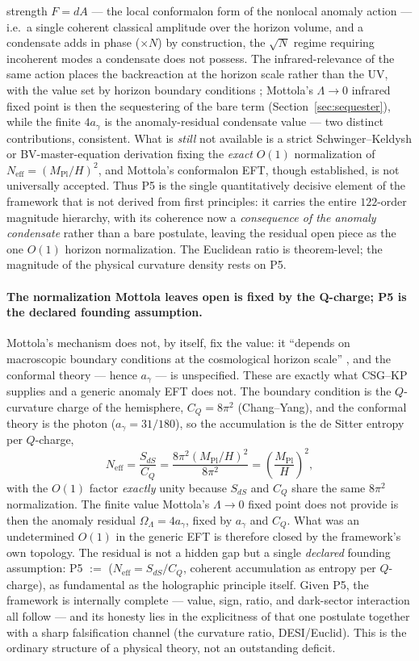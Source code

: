 \documentclass[11pt,a4paper]{article}
\theoremstyle{plain}
\theoremstyle{definition}
\theoremstyle{remark}
\newcommand{\OL}{\Omega_\Lambda}
\newcommand{\ag}{a_\gamma}
\newcommand{\CQ}{C_Q}
\newcommand{\Mpl}{M_{\mathrm{Pl}}}
\begin{document}
strength $F=dA$ --- the local conformalon form of the nonlocal anomaly action --- i.e.\ a single
coherent classical amplitude over the horizon volume, and a condensate adds in phase ($\times N$) by
construction, the $\sqrt N$ regime requiring incoherent modes a condensate does not possess. The
infrared-relevance of the same action places the backreaction at the horizon scale rather than the
UV, with the value set by horizon boundary conditions \cite{Mottola2010}; Mottola's
$\Lambda\to0$ infrared fixed point is then the sequestering of the bare term
(Section~\ref{sec:sequester}), while the finite $4\ag$ is the anomaly-residual condensate value ---
two distinct contributions, consistent. What is \emph{still} not available is a
strict Schwinger--Keldysh or BV-master-equation derivation fixing the \emph{exact} $O(1)$
normalization of $N_{\mathrm{eff}}=(\Mpl/H)^2$, and Mottola's conformalon EFT, though established, is
not universally accepted. Thus P5 is the single quantitatively decisive
element of the framework that is not derived from first principles: it carries the entire
$122$-order magnitude hierarchy, with its coherence now a \emph{consequence of the anomaly
condensate} rather than a bare postulate, leaving the residual open piece as the one $O(1)$ horizon
normalization. The Euclidean ratio is theorem-level; the magnitude of the physical curvature
density rests on P5.

\paragraph{The normalization Mottola leaves open is fixed by the Q-charge; P5 is the declared
founding assumption.} Mottola's mechanism does not, by itself, fix the value: it ``depends on
macroscopic boundary conditions at the cosmological horizon scale'' \cite{Mottola2010}, and the
conformal theory --- hence $\ag$ --- is unspecified. These are exactly what CSG--KP supplies and a
generic anomaly EFT does not. The boundary condition is the $Q$-curvature charge of the hemisphere,
$\CQ=8\pi^2$ (Chang--Yang), and the conformal theory is the photon ($\ag=31/180$), so the
accumulation is the de Sitter entropy per $Q$-charge,
\begin{equation}
N_{\mathrm{eff}} = \frac{S_{dS}}{\CQ} = \frac{8\pi^2(\Mpl/H)^2}{8\pi^2} = \left(\frac{\Mpl}{H}\right)^2 ,
\end{equation}
with the $O(1)$ factor \emph{exactly} unity because $S_{dS}$ and $\CQ$ share the same $8\pi^2$
normalization. The finite value Mottola's $\Lambda\to0$ fixed point does not provide is then the
anomaly residual $\OL=4\ag$, fixed by $\ag$ and $\CQ$. What was an undetermined $O(1)$ in the
generic EFT is therefore closed by the framework's own topology. The residual is not a hidden gap
but a single \emph{declared} founding assumption: P5 $:=$ ($N_{\mathrm{eff}}=S_{dS}/\CQ$, coherent
accumulation as entropy per $Q$-charge), as fundamental as the holographic principle itself. Given
P5, the framework is internally complete --- value, sign, ratio, and dark-sector interaction all
follow --- and its honesty lies in the explicitness of that one postulate together with a sharp
falsification channel (the curvature ratio, DESI/Euclid). This is the ordinary structure of a
physical theory, not an outstanding deficit.
\end{document}
